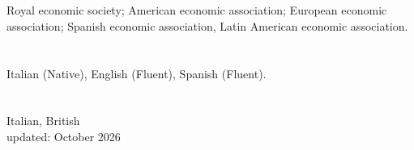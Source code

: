 \documentclass[margin, 11pt]{res} %
\begin{document}
\begin{resume}
 
\section{}
Royal economic society; American economic association; European economic association; Spanish economic association, Latin American economic association.

\section{}
Italian (Native), English (Fluent), Spanish (Fluent).

\section{}
Italian, British \\




%
%
%


\centering
updated: October 2026
\end{resume}
\end{document}
